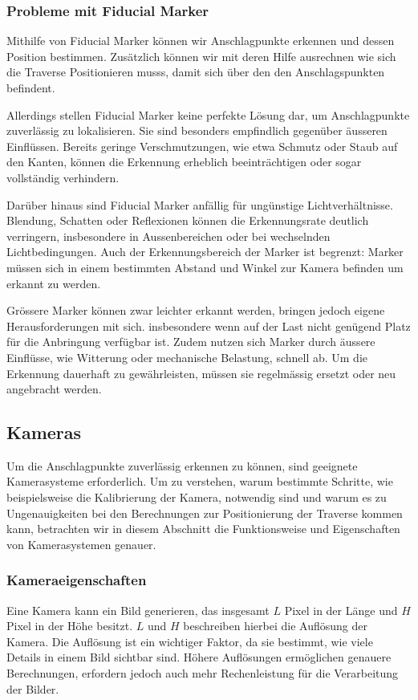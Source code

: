 \subsubsection{Probleme mit Fiducial Marker}
Mithilfe von Fiducial Marker können wir Anschlagpunkte erkennen und dessen Position bestimmen.
Zusätzlich können wir mit deren Hilfe ausrechnen wie sich die Traverse Positionieren musss, damit
sich über den den Anschlagspunkten befindent.

Allerdings stellen Fiducial Marker  keine perfekte Lösung dar, um Anschlagpunkte zuverlässig zu lokalisieren. 
Sie sind besonders empfindlich gegenüber äusseren Einflüssen. Bereits geringe Verschmutzungen, 
wie etwa Schmutz oder Staub auf den Kanten, können die Erkennung erheblich beeinträchtigen 
oder sogar vollständig verhindern.

Darüber hinaus sind Fiducial Marker anfällig für ungünstige Lichtverhältnisse. Blendung, Schatten 
oder Reflexionen können die Erkennungsrate deutlich verringern, insbesondere in Aussenbereichen 
oder bei wechselnden Lichtbedingungen. Auch der Erkennungsbereich der Marker ist begrenzt: Marker 
müssen sich in einem bestimmten Abstand und Winkel zur Kamera befinden um erkannt zu werden.

Grössere Marker können zwar leichter erkannt werden, bringen jedoch eigene Herausforderungen mit sich. 
insbesondere wenn auf der Last nicht genügend Platz für die Anbringung verfügbar ist. Zudem nutzen 
sich Marker durch äussere Einflüsse, wie Witterung oder mechanische Belastung, schnell ab. Um die 
Erkennung dauerhaft zu gewährleisten, müssen sie regelmässig ersetzt oder neu angebracht werden.


\clearpage
\subsection{Kameras}
Um die Anschlagpunkte zuverlässig erkennen zu können, sind geeignete Kamerasysteme
erforderlich. Um zu verstehen, warum bestimmte Schritte, wie beispielsweise die 
Kalibrierung der Kamera, notwendig sind und warum es zu Ungenauigkeiten bei den 
Berechnungen zur Positionierung der Traverse kommen kann, betrachten wir in diesem 
Abschnitt die Funktionsweise und Eigenschaften von Kamerasystemen genauer.

\subsubsection{Kameraeigenschaften}
Eine Kamera kann ein Bild generieren, das insgesamt \( L \) Pixel in 
der Länge und \( H \) Pixel in der Höhe besitzt. \( L \) und \( H \) 
beschreiben hierbei die Auflösung der Kamera. Die Auflösung ist ein 
wichtiger Faktor, da sie bestimmt, wie viele Details in einem Bild 
sichtbar sind. Höhere Auflösungen ermöglichen genauere Berechnungen, 
erfordern jedoch auch mehr Rechenleistung für die Verarbeitung der 
Bilder.

